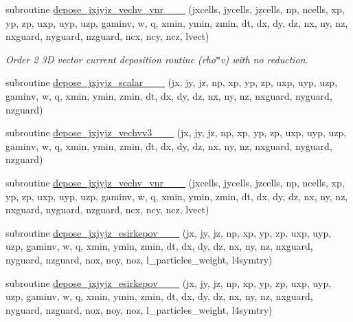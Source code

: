 \begin{DoxyCompactItemize}
subroutine \hyperlink{current__deposition_8_f90_a110bf577b181354401374e000770acbf}{depose\+\_\+jxjyjz\+\_\+vechv\+\_\+vnr\+\_\+\_\+\_} (jxcells, jycells, jzcells, np, ncells, xp, yp, zp,                                   uxp, uyp, uzp, gaminv, w, q, xmin, ymin, zmin,                                       dt, dx, dy, dz, nx, ny, nz, nxguard, nyguard, nzguard, ncx, ncy, ncz, lvect)
\begin{DoxyCompactList}\small\item\em Order 2 3D vector current deposition routine (rho$\ast$v) with no reduction. \end{DoxyCompactList}\item 
subroutine \hyperlink{current__deposition_8_f90_a9b0dd01b38cde503f1aac44bb2bd1ca8}{depose\+\_\+jxjyjz\+\_\+scalar\+\_\+\_\+\_} (jx, jy, jz, np, xp, yp, zp, uxp, uyp, uzp, gaminv, w, q, xmin, ymin, zmin,                                       dt, dx, dy, dz, nx, ny, nz, nxguard, nyguard, nzguard)
\item 
subroutine \hyperlink{current__deposition_8_f90_a4b4bb06ef5eb6ca6e28d2c24472fb216}{depose\+\_\+jxjyjz\+\_\+vechvv3\+\_\+\_\+\_} (jx, jy, jz, np, xp, yp, zp, uxp, uyp, uzp, gaminv, w, q, xmin, ymin, zmin,                                       dt, dx, dy, dz, nx, ny, nz, nxguard, nyguard, nzguard)
\item 
subroutine \hyperlink{current__deposition_8_f90_a95bde392441e1836c282cd5b53c6e5c1}{depose\+\_\+jxjyjz\+\_\+vechv\+\_\+vnr\+\_\+\_\+\_} (jxcells, jycells, jzcells, np, ncells, xp, yp, zp,                                   uxp, uyp, uzp, gaminv, w, q, xmin, ymin, zmin,                                       dt, dx, dy, dz, nx, ny, nz, nxguard, nyguard, nzguard, ncx, ncy, ncz, lvect)
\item 
subroutine \hyperlink{current__deposition_8_f90_ad43ded0ebf597e9d3cb47ff84ec04413}{depose\+\_\+jxjyjz\+\_\+esirkepov\+\_\+\_\+\_} (jx, jy, jz, np, xp, yp, zp, uxp, uyp, uzp, gaminv, w, q, xmin, ymin, zmin,                                                                                                                                                   dt, dx, dy, dz, nx, ny, nz, nxguard, nyguard, nzguard,                                                                                                                                                   nox, noy, noz, l\+\_\+particles\+\_\+weight, l4symtry)
\item 
subroutine \hyperlink{current__deposition_8_f90_a1b0279f68e8d25ed75dea74ec525c04b}{depose\+\_\+jxjyjz\+\_\+esirkepov\+\_\+\_\+\_} (jx, jy, jz, np, xp, yp, zp, uxp, uyp, uzp, gaminv, w, q, xmin, ymin, zmin,                                                                                                                                                   dt, dx, dy, dz, nx, ny, nz, nxguard, nyguard, nzguard,                                                                                                                                                   nox, noy, noz, l\+\_\+particles\+\_\+weight, l4symtry)

\end{DoxyCompactItemize}
